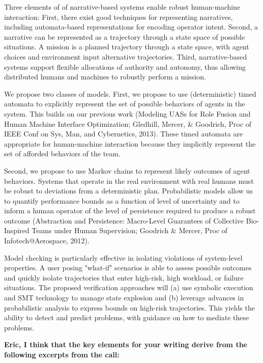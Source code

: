 Three elements of of narrative-based systems enable robust
human-machine interaction: First, there exist good techniques for
representing narratives, including automata-based representations for
encoding operator intent.  Second, a narrative can be represented as a
trajectory through a state space of possible situations.  A mission is
a planned trajectory through a state space, with agent choices and
environment input alternative trajectories. Third, narrative-based
systems support flexible allocations of authority and autonomy, thus
allowing distributed humans and machines to robustly perform a
mission.

We propose two classes of models.  First, we propose to use
(deterministic) timed automata to explicitly represent the set of
possible behaviors of agents in the system.  This builds on our
previous work (Modeling UASs for Role Fusion and Human Machine
Interface Optimization; Gledhill, Mercer, \& Goodrich, Proc of IEEE
Conf on Sys, Man, and Cybernetics, 2013).  These timed automata are
appropriate for human-machine interaction because they implicitly
represent the set of afforded behaviors of the team.

Second, we propose to use Markov chains to represent likely outcomes
of agent behaviors.  Systems that operate in the real environment with
real humans must be robust to deviations from a deterministic plan.
Probabilistic models allow us to quantify performance bounds as a
function of level of uncertainty and to inform a human operator of the
level of persistence required to produce a robust outcome (Abstraction
and Persistence: Macro-Level Guarantees of Collective Bio-Inspired
Teams under Human Supervision; Goodrich \& Mercer, Proc of
Infotech@Aerospace, 2012).

Model checking is particularly effective in isolating violations of
system-level properties. A user posing "what-if" scenarios is able to
assess possible outcomes and quickly isolate trajectories that enter
high-risk, high workload, or failure situations. The proposed
verification approaches will (a) use symbolic execution and SMT
technology to manage state explosion and (b) leverage advances in
probabilistic analysis to express bounds on high-risk
trajectories. This yields the ability to detect and predict problems,
with guidance on how to mediate these problems.

\textbf{Eric, I think that the key elements for your writing derive from the following excerpts from the call:}

